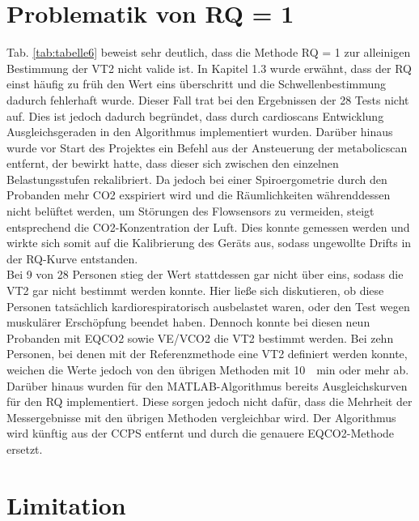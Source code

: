 \section{Problematik von RQ = 1}

Tab. \ref{tab:tabelle6} beweist sehr deutlich, dass die Methode RQ = 1 zur alleinigen Bestimmung der VT2 nicht valide ist. In Kapitel 1.3 wurde erwähnt, dass der RQ einst häufig zu früh den Wert eins überschritt und die Schwellenbestimmung dadurch fehlerhaft wurde. Dieser Fall trat bei den Ergebnissen der 28 Tests nicht auf. Dies ist jedoch dadurch begründet, dass durch cardioscans Entwicklung Ausgleichsgeraden in den Algorithmus implementiert wurden. Darüber hinaus wurde vor Start des Projektes ein Befehl aus der Ansteuerung der metabolicscan entfernt, der bewirkt hatte, dass dieser sich zwischen den einzelnen Belastungsstufen rekalibriert. Da jedoch bei einer Spiroergometrie durch den Probanden mehr \acs{CO2} exspiriert wird und die Räumlichkeiten währenddessen nicht belüftet werden, um Störungen des Flowsensors zu vermeiden, steigt entsprechend die \acs{CO2}-Konzentration der Luft. Dies konnte gemessen werden und wirkte sich somit auf die Kalibrierung des Geräts aus, sodass ungewollte Drifts in der RQ-Kurve entstanden.\\
Bei 9 von 28 Personen stieg der Wert stattdessen gar nicht über eins, sodass die VT2 gar nicht bestimmt werden konnte. Hier ließe sich diskutieren, ob diese Personen tatsächlich kardiorespiratorisch ausbelastet waren, oder den Test wegen muskulärer Erschöpfung beendet haben. Dennoch konnte bei diesen neun Probanden mit \acs{EQCO2} sowie \acs{VE}/\acs{VCO2} die VT2 bestimmt werden. Bei zehn Personen, bei denen mit der Referenzmethode eine VT2 definiert werden konnte, weichen die Werte jedoch von den übrigen Methoden mit \SI{10}{\per\minute} oder mehr ab. Darüber hinaus wurden für den MATLAB-Algorithmus bereits Ausgleichskurven für den RQ implementiert. Diese sorgen jedoch nicht dafür, dass die Mehrheit der Messergebnisse mit den übrigen Methoden vergleichbar wird. Der Algorithmus wird künftig aus der \acs{CCPS} entfernt und durch die genauere \acs{EQCO2}-Methode ersetzt.

\section{Limitation}

